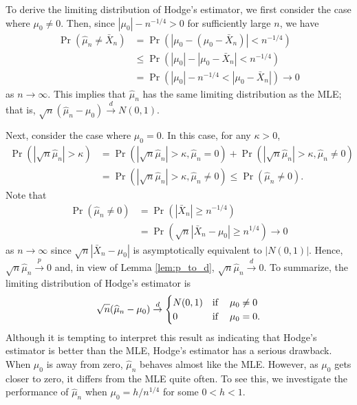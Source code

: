 \documentclass[11pt, A4paper, openany, uplatex]{book}
\begin{document}
To derive the limiting distribution of Hodge's estimator, we first consider the case where $\mu_0 \neq 0$.
Then, since $|\mu_0| - n^{-1/4} > 0$ for sufficiently large $n$, we have
\begin{align*}
	\Pr(\hat \mu_n \neq \bar X_n) 
	& = \Pr(|\mu_0 - (\mu_0 - \bar X_n) | < n^{-1/4}) \\
	& \le \Pr(|\mu_0| - |\mu_0 - \bar X_n| < n^{-1/4}) \\
	& = \Pr(|\mu_0| - n^{-1/4} < |\mu_0 - \bar X_n|) \to 0
\end{align*}
as $n \to \infty$.
This implies that $\hat \mu_n$ has the same limiting distribution as the MLE; that is, $\sqrt{n}(\hat \mu_n - \mu_0) \overset{d}{\to} N(0, 1)$.

Next, consider the case where $\mu_0 = 0$.
In this case, for any $\kappa > 0$,
\begin{align*}
	\Pr\left(\left| \sqrt{n} \hat \mu_n \right| > \kappa \right) 
	& = \Pr\left(\left| \sqrt{n}\hat \mu_n \right| > \kappa, \hat \mu_n = 0\right) + \Pr\left( \left| \sqrt{n} \hat \mu_n \right| > \kappa, \hat \mu_n \neq 0\right) \\
	& = \Pr(\left| \sqrt{n} \hat \mu_n \right| > \kappa, \hat \mu_n \neq 0)  \le \Pr( \hat \mu_n \neq 0). 
\end{align*}
Note that
\begin{align*}
	\Pr( \hat \mu_n \neq 0) 
	& = \Pr(|\bar X_n| \ge n^{-1/4}) \\
	& = \Pr(\sqrt{n}|\bar X_n - \mu_0| \ge n^{1/4}) \to 0
\end{align*}
as $n \to \infty$ since $\sqrt{n}|\bar X_n - \mu_0|$ is asymptotically equivalent to $|N(0,1)|$.
Hence, $\sqrt{n}\hat \mu_n \overset{p}{\to} 0$ and, in view of Lemma \ref{lem:p_to_d}, $\sqrt{n}\hat \mu_n \overset{d}{\to} 0$.
To summarize, the limiting distribution of Hodge's estimator is
\begin{align*}
	\sqrt{n}(\hat \mu_n - \mu_0) \overset{d}{\to} \begin{cases}
		N(0,1) & \text{if \;\; $\mu_0 \neq 0$}\\
		0      & \text{if \;\; $\mu_0 = 0$}.
	\end{cases}
\end{align*}
Although it is tempting to interpret this result as indicating that Hodge's estimator is better than the MLE, Hodge's estimator has a serious drawback.
When $\mu_0$ is away from zero, $\hat \mu_n$ behaves almost like the MLE.
However, as $\mu_0$ gets closer to zero, it differs from the MLE quite often.
To see this, we investigate the performance of $\hat \mu_n$ when $\mu_0 = h/n^{1/4}$ for some $0 < h < 1$.
\end{document}
